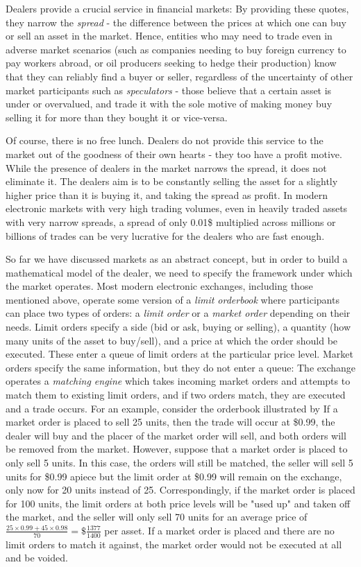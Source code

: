 Dealers provide a crucial service in financial markets: By providing these quotes, 
they narrow the \textit{spread} - the difference between the prices at which one can buy or sell an asset in the market. 
Hence, entities who may need to trade even in adverse market scenarios (such as companies needing to buy foreign currency to pay workers abroad, 
or oil producers seeking to hedge their production) know that they can reliably find a buyer or seller, 
regardless of the uncertainty of other market participants such as \textit{speculators} - those believe that a certain asset is under or overvalued, 
and trade it with the sole motive of making money buy selling it for more than they bought it or vice-versa.

Of course, there is no free lunch. Dealers do not provide this service to the market out of the goodness of their own hearts - they too have a profit motive. 
While the presence of dealers in the market narrows the spread, it does not eliminate it. 
The dealers aim is to be constantly selling the asset for a slightly higher price than it is buying it, and taking the spread as profit. 
In modern electronic markets with very high trading volumes, even in heavily traded assets with very narrow spreads, a spread of only 0.01\$ 
multiplied across millions or billions of trades can be very lucrative for the dealers who are fast enough.

So far we have discussed markets as an abstract concept, but in order to build a mathematical model of the dealer, 
we need to specify the framework under which the market operates. Most modern electronic exchanges, including those mentioned above, 
operate some version of a \textit{limit orderbook} where participants can place two types of orders: a \textit{limit order} or a \textit{market order} 
depending on their needs. Limit orders specify a side (bid or ask, buying or selling), a quantity (how many units of the asset to buy/sell), 
and a price at which the order should be executed. These enter a queue of limit orders at the particular price level. 
Market orders specify the same information, but they do not enter a queue: 
The exchange operates a \textit{matching engine} which takes incoming market orders and attempts to match them to existing limit orders, 
and if two orders match, they are executed and a trade occurs. For an example, consider the orderbook illustrated by %
If a market order is placed to sell 25 units, then the trade will occur at \$0.99, the dealer will buy and the placer of the market order will sell, 
and both orders will be removed from the market. However, suppose that a market order is placed to only sell 5 units. 
In this case, the orders will still be matched, the seller will sell 5 units for \$0.99 apiece but the limit order at \$0.99 will remain on the exchange, 
only now for 20 units instead of 25. Correspondingly, if the market order is placed for 100 units, 
the limit orders at both price levels will be "used up" and taken off the market, 
and the seller will only sell 70 units for an average price of $\frac{25\times0.99+45\times0.98}{70}=\$\frac{1377}{1400}$ per asset. 
If a market order is placed and there are no limit orders to match it against, the market order would not be executed at all and be voided.

